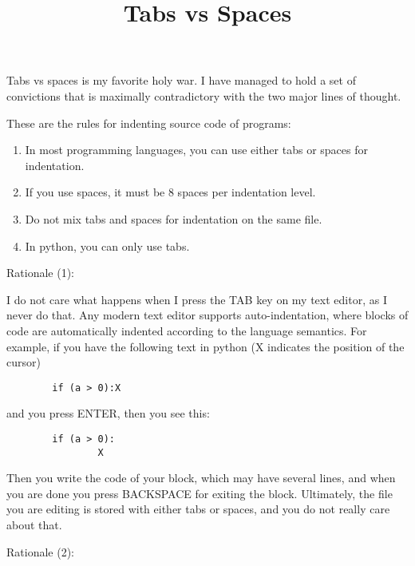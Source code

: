 \title{Tabs vs Spaces}

Tabs vs spaces is my favorite holy war.  I have managed to hold a set of
convictions that is maximally contradictory with the two major lines of
thought.

These are the rules for indenting source code of programs:

\begin{enumerate}
	\item In most programming languages, you can use either tabs or
		spaces for indentation.
	\item If you use spaces, it must be 8 spaces per indentation level.
	\item Do not mix tabs and spaces for indentation on the same file.
	\item In python, you can only use tabs.
\end{enumerate}

Rationale (1):

I do not care what happens when I press the TAB key on my text editor, as I
never do that.  Any modern text editor supports auto-indentation, where
blocks of code are automatically indented according to the language
semantics.  For example, if you have the following text in python (X
indicates the position of the cursor)

\begin{verbatim}
        if (a > 0):X
\end{verbatim}

and you press ENTER, then you see this:

\begin{verbatim}
        if (a > 0):
                X
\end{verbatim}

Then you write the code of your block, which may have several lines, and when
you are done you press BACKSPACE for exiting the block.
Ultimately, the file you are editing is stored with either tabs or spaces,
and you do not really care about that.


\bigskip

Rationale (2):




